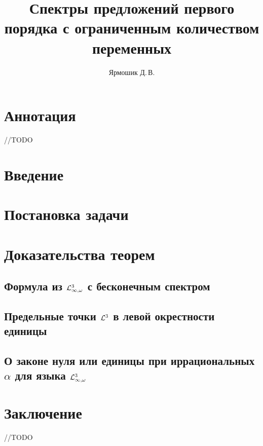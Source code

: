\documentclass{mipt-thesis-bs}
\title{Спектры предложений первого порядка с ограниченным количеством переменных}
\author{Ярмошик Д.\,В.}
\begin{document}
\frontmatter
\titlecontents

\mainmatter

\chapter{Аннотация}
//TODO

\chapter{Введение}


\chapter{Постановка задачи}


\chapter{Доказательства теорем}
\section{Формула из $\mathcal{L}^3_{\infty, \omega}$ с бесконечным спектром}


\section{Предельные точки $\mathcal{L}^3$ в левой окрестности единицы}


\section{О законе нуля или единицы при иррациональных $\alpha$ для языка $\mathcal{L}^3_{\infty, \omega}$}


\chapter{Заключение}
//TODO

\backmatter


\end{document}
